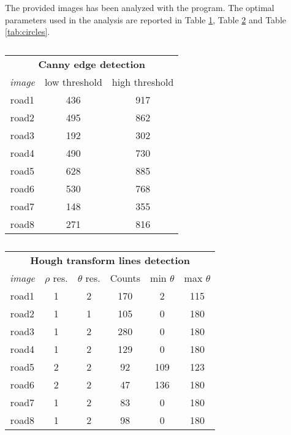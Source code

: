 \documentclass[11pt,a4paper]{article}
\begin{document}
The provided images has been analyzed with the program. The optimal parameters used in the analysis are reported in Table \ref{tab:edges}, Table \ref{tab:lines} and Table \ref{tab:circles}.

\begin{table}[b]
	\begin{center}
		\begin{tabular}{ccc}
			\hline
			 \multicolumn{3}{c}{\textbf{Canny edge detection}}   \\
			\textit{image} & low threshold & high threshold \\ \hline
			  road1    &      436      &      917       \\
			  road2    &      495      &      862       \\
			  road3    &      192      &      302       \\
			  road4    &      490      &      730       \\
			  road5    &      628      &      885       \\
			  road6    &      530      &      768       \\
			  road7    &      148      &      355       \\
			  road8    &      271      &      816       \\ \hline
		\end{tabular}
	\end{center}
	\caption{}
	\label{tab:edges}
\end{table} 
\begin{table}
	\begin{center}
		\begin{tabular}{cccccc}
			\hline
			    \multicolumn{6}{c}{\textbf{Hough transform lines detection}}      \\
			\textit{image} & $\rho$ res. & $\theta$ res. & Counts & min $\theta$ & max $\theta$ \\ \hline
			  road1    &    1    &     2      &    170    &     2     &    115    \\
			  road2    &    1    &     1      &    105    &     0     &    180    \\
			  road3    &    1    &     2      &    280    &     0     &    180    \\
			  road4    &    1    &     2      &    129    &     0     &    180    \\
			  road5    &    2    &     2      &    92     &    109    &    123    \\
			  road6    &    2    &     2      &    47     &    136    &    180    \\
			  road7    &    1    &     2      &    83     &     0     &    180    \\
			  road8    &    1    &     2      &    98     &     0     &    180    \\ \hline
		\end{tabular}
	\end{center}
	\caption{}
	\label{tab:lines}
\end{table} 
\end{document}
